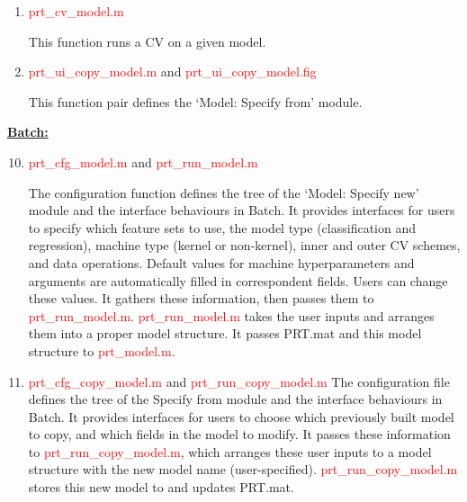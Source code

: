 \begin{enumerate}
This function configures and builds the \textcolor{blue}{PRT.model} structure.

\item \textcolor{red}{prt\_cv\_model.m}

This function runs a CV on a given model.

\item \textcolor{red}{prt\_ui\_copy\_model.m} and \textcolor{red}{prt\_ui\_copy\_model.fig}

This function pair defines the `Model: Specify from' module. 





\end{enumerate}


\noindent \textbf{\underline{Batch:}}


\begin{enumerate}
\setcounter{enumi}{9}

\item \textcolor{red}{prt\_cfg\_model.m} and \textcolor{red}{prt\_run\_model.m}

The configuration function defines the tree of the `Model: Specify new' module and the interface behaviours in Batch. It provides interfaces for users to specify which feature sets to use, the model type (classification and regression), machine type (kernel or non-kernel), inner and outer CV schemes, and data operations. Default values for machine hyperparameters and arguments are automatically filled in correspondent fields. Users can change these values. It gathers these information, then passes them to \textcolor{red}{prt\_run\_model.m}. \textcolor{red}{prt\_run\_model.m} takes the user inputs and arranges them into a proper model structure. It passes PRT.mat and this model structure to \textcolor{red}{prt\_model.m}. 

\item \textcolor{red}{prt\_cfg\_copy\_model.m} and \textcolor{red}{prt\_run\_copy\_model.m}
The configuration file defines the tree of the Specify from module and the interface behaviours in Batch. It provides interfaces for users to choose which previously built model to copy, and which fields in the model to modify. It passes these information to \textcolor{red}{prt\_run\_copy\_model.m}, which arranges these user inputs to a model structure with the new model name (user-specified). \textcolor{red}{prt\_run\_copy\_model.m} stores this new model to and updates PRT.mat. 


\end{enumerate}




